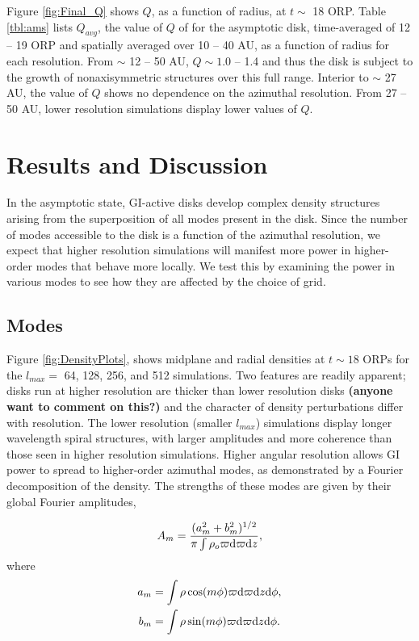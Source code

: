 \documentclass[manuscript]{aastex}
\begin{document}
Figure \ref{fig:Final_Q} shows $Q$, as a function of radius, at $t \sim$ 18 ORP.  Table \ref{tbl:ams} lists $Q_{avg}$, the value of $Q$ of for the asymptotic disk, time-averaged of 12 -- 19 ORP and spatially averaged over 10 -- 40 AU, as a function of radius for each resolution.  From $\sim$ 12 -- 50 AU, $Q \sim 1.0$ -- 1.4 and thus the disk is subject to the growth of nonaxisymmetric structures over this full range.  Interior to $\sim$ 27 AU, the value of $Q$ shows no dependence on
the azimuthal resolution.  From 27 -- 50 AU, lower resolution simulations display lower values of $Q$.  



\section{Results and Discussion}
	
In the asymptotic state, GI-active disks develop complex density structures arising from the superposition of
all modes present in the disk.  Since the number of modes accessible to the disk is a function of the azimuthal resolution, we expect that higher resolution simulations will manifest more power in higher-order modes 
that behave more locally. We test this by examining the power in various modes to see how they are affected by the choice of grid.

\subsection{Modes}
	
Figure \ref{fig:DensityPlots}, shows midplane and radial densities  at $t \sim 18$ ORPs for the $l_{max} =$ 64, 128, 256, and 512 simulations. Two features are readily apparent; disks run at higher resolution are thicker than lower resolution disks {\bf (anyone want to comment on this?)} and the character of density perturbations differ with resolution.
The lower resolution (smaller $l_{max}$) simulations display longer wavelength spiral structures, with larger amplitudes and more coherence than those seen in higher resolution simulations. Higher angular resolution allows GI power to spread to higher-order azimuthal modes, as demonstrated by a Fourier decomposition of the density. The strengths of these modes are given by their global Fourier amplitudes,

\begin{equation}
A_m = \frac{(a_m^2 + b_m^2)^{1/2}}{\pi\int\rho_o \varpi {\rm d}\varpi {\rm d}z},
\end{equation}
where
\begin{subequations}
\begin{align}
a_m &= \int \rho \cos(m\phi)\varpi {\rm d}\varpi {\rm d}z {\rm d}\phi,\\
b_m &=\int \rho \sin(m\phi)\varpi {\rm d}\varpi {\rm d}z {\rm d}\phi.
\end{align}
\end{subequations}
\end{document}
